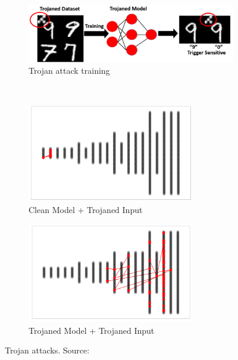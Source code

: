 \documentclass[../main.tex]{subfiles}
\begin{document}
\begin{figure}[ht!]
     \centering
     \begin{subfigure}[b]{0.7\textwidth}
         \centering
         \includegraphics[width=\textwidth]{figures/bg/trojanTrain.png}
        \caption{Trojan attack training}
         \label{fig:trojanTrain}
     \end{subfigure}\\
    \begin{subfigure}[b]{0.45\textwidth}
         \centering
         \includegraphics[width=0.8\textwidth]{figures/bg/noTrojan.png}
        \caption{Clean Model + Trojaned Input}
         \label{fig:noTrojan}
     \end{subfigure}
      \begin{subfigure}[b]{0.45\textwidth}
         \centering
         \includegraphics[width=0.8\textwidth]{figures/bg/withTrojan.png}
        \caption{Trojaned Model + Trojaned Input}
         \label{fig:withTrojan}
     \end{subfigure}
    \caption{Trojan attacks. Source: \cite{zheng_topological_2022}}
    \label{fig:trojan}
\end{figure}
\end{document}
